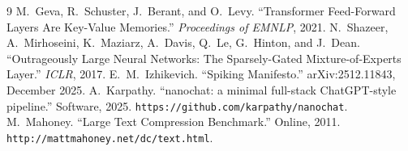 \documentclass[11pt]{article}
\begin{document}
\begin{thebibliography}{9}
 M.~Geva, R.~Schuster, J.~Berant, and O.~Levy.
``Transformer Feed-Forward Layers Are Key-Value Memories.''
\emph{Proceedings of EMNLP}, 2021.
 N.~Shazeer, A.~Mirhoseini, K.~Maziarz, A.~Davis, Q.~Le, G.~Hinton, and
J.~Dean. ``Outrageously Large Neural Networks: The Sparsely-Gated Mixture-of-Experts Layer.''
\emph{ICLR}, 2017.
 E.~M.~Izhikevich.
``Spiking Manifesto.''
arXiv:2512.11843, December 2025.
 A.~Karpathy. ``nanochat: a minimal full-stack ChatGPT-style pipeline.''
Software, 2025. \texttt{https://github.com/karpathy/nanochat}.
 M.~Mahoney. ``Large Text Compression Benchmark.'' Online, 2011.
\texttt{http://mattmahoney.net/dc/text.html}.
\end{thebibliography}
\end{document}
